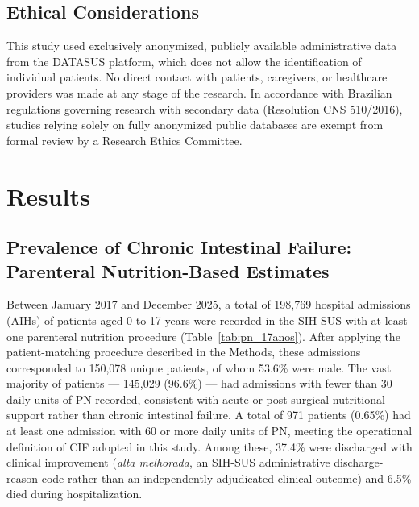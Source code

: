 \documentclass[12pt,a4paper]{article}
\theoremstyle{plain}
\theoremstyle{definition}
\theoremstyle{remark}
\begin{document}
\subsection*{Ethical Considerations}

This study used exclusively anonymized, publicly available administrative data from the DATASUS platform, which does not allow the identification of individual patients. No direct contact with patients, caregivers, or healthcare providers was made at any stage of the research. In accordance with Brazilian regulations governing research with secondary data (Resolution CNS 510/2016), studies relying solely on fully anonymized public databases are exempt from formal review by a Research Ethics Committee.


\section{Results}\label{sec3}

\subsection*{Prevalence of Chronic Intestinal Failure: Parenteral Nutrition-Based Estimates}

Between January 2017 and December 2025, a total of 198,769 hospital admissions (AIHs) of patients aged 0 to 17 years were recorded in the SIH-SUS with at least one parenteral nutrition procedure (Table~\ref{tab:pn_17anos}). After applying the patient-matching procedure described in the Methods, these admissions corresponded to 150,078 unique patients, of whom 53.6\% were male. The vast majority of patients --- 145,029 (96.6\%) --- had admissions with fewer than 30 daily units of PN recorded, consistent with acute or post-surgical nutritional support rather than chronic intestinal failure. A total of 971 patients (0.65\%) had at least one admission with 60 or more daily units of PN, meeting the operational definition of CIF adopted in this study. Among these, 37.4\% were discharged with clinical improvement (\textit{alta melhorada}, an SIH-SUS administrative discharge-reason code rather than an independently adjudicated clinical outcome) and 6.5\% died during hospitalization.
\end{document}
